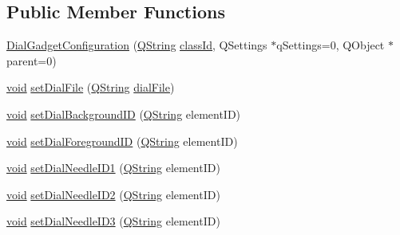 \subsection*{Public Member Functions}
\begin{DoxyCompactItemize}
\item 
\hyperlink{group___dial_plugin_ga5818a8a26f5b9e63b9bc37f459ca6594}{Dial\-Gadget\-Configuration} (\hyperlink{group___u_a_v_objects_plugin_gab9d252f49c333c94a72f97ce3105a32d}{Q\-String} \hyperlink{group___core_plugin_gac953657221ba7fda967ada0408332641}{class\-Id}, Q\-Settings $\ast$q\-Settings=0, Q\-Object $\ast$parent=0)
\item 
\hyperlink{group___u_a_v_objects_plugin_ga444cf2ff3f0ecbe028adce838d373f5c}{void} \hyperlink{group___dial_plugin_ga7172a5e20f324dd2e11a31167ee87a9a}{set\-Dial\-File} (\hyperlink{group___u_a_v_objects_plugin_gab9d252f49c333c94a72f97ce3105a32d}{Q\-String} \hyperlink{group___dial_plugin_ga620e44289c1d546a4fdd1c604d889eaa}{dial\-File})
\item 
\hyperlink{group___u_a_v_objects_plugin_ga444cf2ff3f0ecbe028adce838d373f5c}{void} \hyperlink{group___dial_plugin_gaed251d96de4cea86a69a9b52529c5c69}{set\-Dial\-Background\-I\-D} (\hyperlink{group___u_a_v_objects_plugin_gab9d252f49c333c94a72f97ce3105a32d}{Q\-String} element\-I\-D)
\item 
\hyperlink{group___u_a_v_objects_plugin_ga444cf2ff3f0ecbe028adce838d373f5c}{void} \hyperlink{group___dial_plugin_gae2dfdc5ebf459904a68d37b1401bf723}{set\-Dial\-Foreground\-I\-D} (\hyperlink{group___u_a_v_objects_plugin_gab9d252f49c333c94a72f97ce3105a32d}{Q\-String} element\-I\-D)
\item 
\hyperlink{group___u_a_v_objects_plugin_ga444cf2ff3f0ecbe028adce838d373f5c}{void} \hyperlink{group___dial_plugin_ga348ba33a6676d7777a8fb313029f71a0}{set\-Dial\-Needle\-I\-D1} (\hyperlink{group___u_a_v_objects_plugin_gab9d252f49c333c94a72f97ce3105a32d}{Q\-String} element\-I\-D)
\item 
\hyperlink{group___u_a_v_objects_plugin_ga444cf2ff3f0ecbe028adce838d373f5c}{void} \hyperlink{group___dial_plugin_ga10bf865d3762437b52c122ca25827bf1}{set\-Dial\-Needle\-I\-D2} (\hyperlink{group___u_a_v_objects_plugin_gab9d252f49c333c94a72f97ce3105a32d}{Q\-String} element\-I\-D)
\item 
\hyperlink{group___u_a_v_objects_plugin_ga444cf2ff3f0ecbe028adce838d373f5c}{void} \hyperlink{group___dial_plugin_gaa9309c52e9b730a340f1c28ec1dc8a51}{set\-Dial\-Needle\-I\-D3} (\hyperlink{group___u_a_v_objects_plugin_gab9d252f49c333c94a72f97ce3105a32d}{Q\-String} element\-I\-D)

\end{DoxyCompactItemize}
